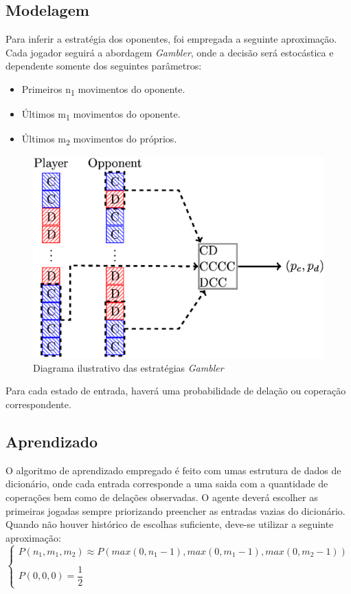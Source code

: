 \documentclass[a4paper]{article}
\begin{document}
		\subsection{Modelagem}
			Para inferir a estratégia dos oponentes, foi empregada a seguinte aproximação.
			\\
			Cada jogador seguirá a abordagem \textit{Gambler}, onde a decisão será estocástica e dependente somente dos seguintes parâmetros:

			\begin{itemize}  
				\item Primeiros n\textsubscript{1} movimentos do oponente.
				\item Últimos m\textsubscript{1} movimentos do oponente.
				\item Últimos m\textsubscript{2} movimentos do próprios.
			\end{itemize}

			\begin{figure}[h]
				\begin{center}
					\includegraphics[width=.5\textwidth]{gambler}
				\end{center}
				\caption{Diagrama ilustrativo das estratégias \textit{Gambler}}
			\end{figure}

			Para cada estado de entrada, haverá uma probabilidade de delação ou coperação correspondente.

		\subsection{Aprendizado}
			O algoritmo de aprendizado empregado é feito com umas estrutura de dados de dicionário, onde cada entrada corresponde a uma saida com a quantidade de coperações bem como de delações observadas.
			O agente deverá escolher as primeiras jogadas sempre priorizando preencher as entradas vazias do dicionário.
			\\
			Quando não houver histórico de escolhas suficiente, deve-se utilizar a seguinte aproximação:
			$$
			\begin{cases}
				P(n_1,m_1,m_2) \approx P(max(0,n_1-1),max(0,m_1-1),max(0,m_2-1))
				\\ \\
				P(0,0,0) = \dfrac 1 2
			\end{cases}
			$$
\end{document}
